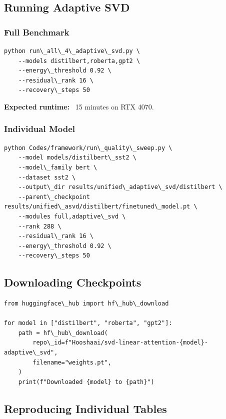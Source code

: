 \subsection{Running Adaptive SVD}

\subsubsection{Full Benchmark}

\begin{lstlisting}
python run\_all\_4\_adaptive\_svd.py \
    --models distilbert,roberta,gpt2 \
    --energy\_threshold 0.92 \
    --residual\_rank 16 \
    --recovery\_steps 50
\end{lstlisting}

\textbf{Expected runtime:} ~15 minutes on RTX 4070.

\subsubsection{Individual Model}

\begin{lstlisting}
python Codes/framework/run\_quality\_sweep.py \
    --model models/distilbert\_sst2 \
    --model\_family bert \
    --dataset sst2 \
    --output\_dir results/unified\_adaptive\_svd/distilbert \
    --parent\_checkpoint results/unified\_asvd/distilbert/finetuned\_model.pt \
    --modules full,adaptive\_svd \
    --rank 288 \
    --residual\_rank 16 \
    --energy\_threshold 0.92 \
    --recovery\_steps 50
\end{lstlisting}

\subsection{Downloading Checkpoints}

\begin{lstlisting}
from huggingface\_hub import hf\_hub\_download

for model in ["distilbert", "roberta", "gpt2"]:
    path = hf\_hub\_download(
        repo\_id=f"Hooshaai/svd-linear-attention-{model}-adaptive\_svd",
        filename="weights.pt",
    )
    print(f"Downloaded {model} to {path}")
\end{lstlisting}

\subsection{Reproducing Individual Tables}

